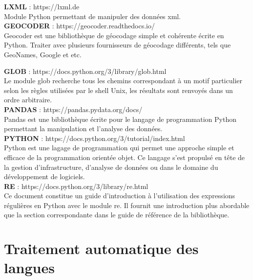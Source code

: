 \documentclass[a4paper,12pt,twoside]{book}
\begin{document}
	\noindent \textbf{LXML} : https://lxml.de \\
	
	Module Python permettant de manipuler des données xml. \\
	
	\noindent \textbf{GEOCODER} : https://geocoder.readthedocs.io/ \\
	
	Geocoder est une bibliothèque de géocodage simple et cohérente écrite en Python. Traiter avec plusieurs fournisseurs de géocodage différents, tels que GeoNames, Google et etc.
	
	\noindent \textbf{GLOB} : https://docs.python.org/3/library/glob.html \\
	
	Le module glob recherche tous les chemins correspondant à un motif particulier selon les règles utilisées par le shell Unix, les résultats sont renvoyés dans un ordre arbitraire. \\
	
	\noindent \textbf{PANDAS} : https://pandas.pydata.org/docs/ \\
	
	Pandas est une bibliothèque écrite pour le langage de programmation Python permettant la manipulation et l'analyse des données. \\
	
	\noindent \textbf{PYTHON} : https://docs.python.org/3/tutorial/index.html \\
	
	Python est une lagage de programmation qui permet une approche simple et efficace de la programmation orientée objet. Ce langage s'est propulsé en tête de la gestion d'infrastructure, d'analyse de données ou dans le domaine du développement de logiciels. \\
	
	\noindent \textbf{RE} : https://docs.python.org/3/library/re.html \\
	
	Ce document constitue un guide d'introduction à l'utilisation des expressions régulières en Python avec le module re. Il fournit une introduction plus abordable que la section correspondante dans le guide de référence de la bibliothèque.
	
	\section{Traitement automatique des langues}
	
\end{document}

